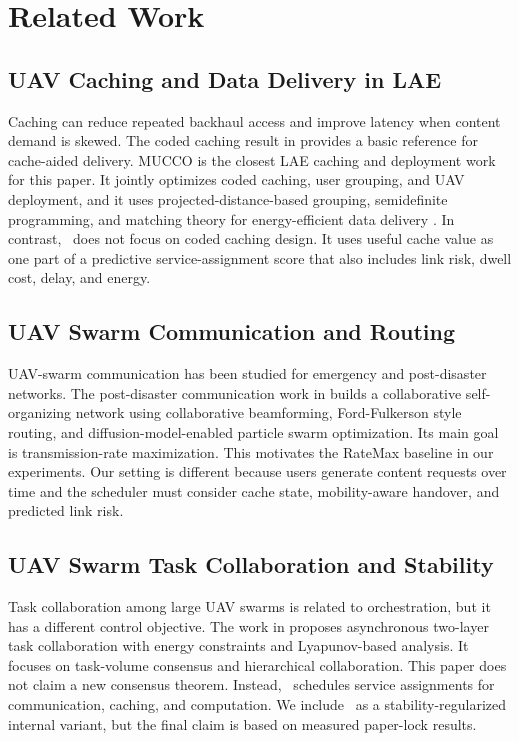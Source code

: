 \section{Related Work}
\subsection{UAV Caching and Data Delivery in LAE}
Caching can reduce repeated backhaul access and improve latency when content demand is skewed. The coded caching result in \cite{maddahali2014fundamental} provides a basic reference for cache-aided delivery. MUCCO is the closest LAE caching and deployment work for this paper. It jointly optimizes coded caching, user grouping, and UAV deployment, and it uses projected-distance-based grouping, semidefinite programming, and matching theory for energy-efficient data delivery \cite{wei2025mucco}. In contrast, \pchorch\ does not focus on coded caching design. It uses useful cache value as one part of a predictive service-assignment score that also includes link risk, dwell cost, delay, and energy.

\subsection{UAV Swarm Communication and Routing}
UAV-swarm communication has been studied for emergency and post-disaster networks. The post-disaster communication work in \cite{zheng2025postdisaster} builds a collaborative self-organizing network using collaborative beamforming, Ford-Fulkerson style routing, and diffusion-model-enabled particle swarm optimization. Its main goal is transmission-rate maximization. This motivates the RateMax baseline in our experiments. Our setting is different because users generate content requests over time and the scheduler must consider cache state, mobility-aware handover, and predicted link risk.

\subsection{UAV Swarm Task Collaboration and Stability}
Task collaboration among large UAV swarms is related to orchestration, but it has a different control objective. The work in \cite{zhou2026dynamic} proposes asynchronous two-layer task collaboration with energy constraints and Lyapunov-based analysis. It focuses on task-volume consensus and hierarchical collaboration. This paper does not claim a new consensus theorem. Instead, \pchorch\ schedules service assignments for communication, caching, and computation. We include \psr\ as a stability-regularized internal variant, but the final claim is based on measured paper-lock results.

